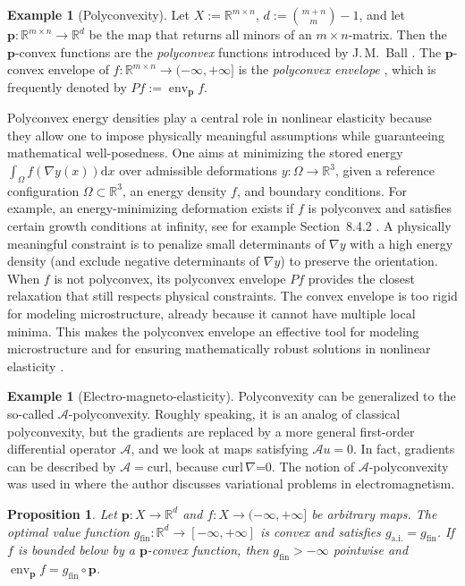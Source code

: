 \documentclass[a4paper,11pt,reqno]{amsart}
\numberwithin{equation}{section}
\theoremstyle{plain}
\newtheorem{proposition}[theorem]{Proposition}
\theoremstyle{definition}
\newtheorem{example}[theorem]{Example}
\newcommand{\bp}{\mathbf{p}}
\newcommand{\cA}{\mathcal{A}} %
\newcommand{\dd}{\mathrm{d}} %
\newcommand{\R}{\mathbb{R}} %
\DeclareMathOperator\env{env} %
\newcommand\ait{\mathrm{a.i.}}
\newcommand\fint{\mathrm{fin}}
\begin{document}
\begin{example}[Polyconvexity]\label{exa:polyconvexity}
Let $X:=\R^{m\times n}$, $d:=\binom{m+n}{m}-1$, and let $\bp\colon\R^{m\times n}\to\R^d$ be 
the map that returns all minors of an $m\times n$-matrix. Then the $\bp$-convex functions 
are the \emph{polyconvex} functions introduced by J.\,M.~Ball \cite{ball76}. The $\bp$-convex 
envelope of $f\colon\R^{m\times n}\to(-\infty,+\infty]$ is the \emph{polyconvex envelope} 
\cite{dacorogna08}, which is frequently denoted by $Pf:=\env_\bp f$. 
\par 
%
Polyconvex energy densities play a central role in nonlinear elasticity because they allow 
one to impose physically meaningful assumptions while guaranteeing mathematical 
well-posedness. One aims at minimizing the stored energy $\int_{\Omega}f(\nabla y(x))\dd x$
over admissible deformations $y\colon\Omega\to\R^3$, given a reference configuration 
$\Omega\subset\R^3$, an energy density $f$, and boundary conditions. For example, an 
energy-minimizing deformation exists if $f$ is polyconvex and satisfies certain growth 
conditions at infinity, see for example Section~8.4.2 \cite{dacorogna08}. A physically 
meaningful constraint is to penalize small determinants of  $\nabla y$ with a high energy density 
(and exclude negative determinants of $\nabla y$) to preserve the orientation. When $f$ is not polyconvex, its 
polyconvex envelope $Pf$ provides the closest relaxation that still respects physical 
constraints. The convex envelope is too rigid for modeling microstructure, already because 
it cannot have multiple local minima. This makes the polyconvex envelope an effective tool 
for modeling microstructure and for ensuring mathematically robust solutions in nonlinear 
elasticity \cite{ciarlet21,kruzik-roubicek19}.
\end{example}
%
\begin{example}[Electro-magneto-elasticity]\label{exa:Silhavy}
Polyconvexity can be generalized to the so-called $\cA$-polyconvexity. Roughly speaking, it is an analog of classical polyconvexity, but the gradients are replaced by a more general first-order differential operator $\cA$, and we look at maps satisfying $\cA u=0$. In fact, gradients can be described by $\cA=\mathrm{curl}$, because $\mathrm{curl}\,\nabla $=0.  
The notion of $\cA$-polyconvexity was used in \cite{silhavy18} where the author discusses variational problems in electromagnetism.
\end{example}
%
\begin{proposition}\label{pro:Dacorogna}
Let $\bp\colon X\to\R^d$ and $f\colon X\to(-\infty,+\infty]$ be arbitrary maps. The optimal 
value function $g_\fint\colon\R^d\to[-\infty,+\infty]$ is convex and satisfies $g_\ait=g_\fint$. 
If $f$ is bounded below by a $\bp$-convex function, then $g_\fint>-\infty$ pointwise and 
$\env_\bp f=g_\fint\circ\bp$. 
\end{proposition}
\end{document}

